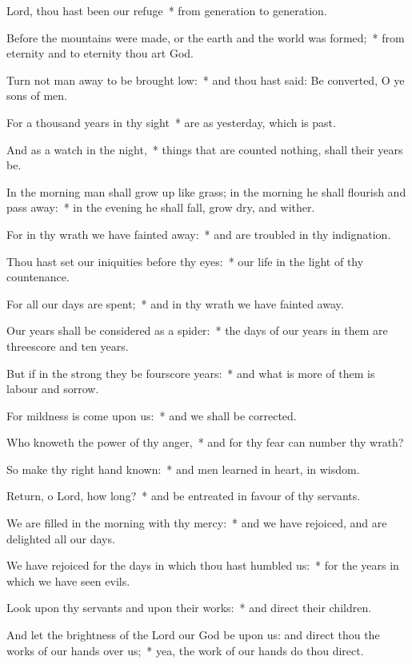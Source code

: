 \begin{enpars}
\item Lord, thou hast been our refuge~* from generation to generation.
\item Before the mountains were made, or the earth and the world was formed;~* from eternity and to eternity thou art God.
\item Turn not man away to be brought low:~* and thou hast said: Be converted, O ye sons of men.
\item For a thousand years in thy sight~* are as yesterday, which is past.
\item And as a watch in the night,~* things that are counted nothing, shall their years be.
\item In the morning man shall grow up like grass; in the morning he shall flourish and pass away:~* in the evening he shall fall, grow dry, and wither.
\item For in thy wrath we have fainted away:~* and are troubled in thy indignation.
\item Thou hast set our iniquities before thy eyes:~* our life in the light of thy countenance.
\item For all our days are spent;~* and in thy wrath we have fainted away.
\item Our years shall be considered as a spider:~* the days of our years in them are threescore and ten years.
\item But if in the strong they be fourscore years:~* and what is more of them is labour and sorrow.
\item For mildness is come upon us:~* and we shall be corrected.
\item Who knoweth the power of thy anger,~* and for thy fear can number thy wrath?
\item So make thy right hand known:~* and men learned in heart, in wisdom.
\item Return, o Lord, how long?~* and be entreated in favour of thy servants.
\item We are filled in the morning with thy mercy:~* and we have rejoiced, and are delighted all our days.
\item We have rejoiced for the days in which thou hast humbled us:~* for the years in which we have seen evils.
\item Look upon thy servants and upon their works:~* and direct their children.
\item And let the brightness of the Lord our God be upon us: and direct thou the works of our hands over us;~* yea, the work of our hands do thou direct.
\end{enpars}